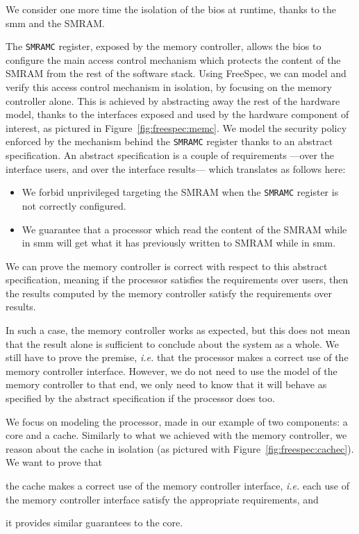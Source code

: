 \begin{example}
  We consider one more time the isolation of the \ac{bios} at runtime, thanks to
  the \ac{smm} and the SMRAM.

  The \texttt{SMRAMC} register, exposed by the memory controller, allows the
  \ac{bios} to configure the main access control mechanism which protects the
  content of the SMRAM from the rest of the software stack.
  Using FreeSpec, we can model and verify this access control mechanism in
  isolation, by focusing on the memory controller alone.
  This is achieved by abstracting away the rest of the hardware model, thanks to
  the interfaces exposed and used by the hardware component of interest, as
  pictured in Figure~\ref{fig:freespec:memc}.
  We model the security policy enforced by the mechanism behind the
  \texttt{SMRAMC} register thanks to an abstract specification.
  An abstract specification is a couple of requirements ---over the interface
  users, and over the interface results--- which translates as follows here:
  \begin{itemize}
  \item We forbid unprivileged \IO targeting the SMRAM when the \texttt{SMRAMC}
    register is not correctly configured.
  \item We guarantee that a processor which read the content of the SMRAM while
    in \ac{smm} will get what it has previously written to SMRAM while in
    \ac{smm}.
  \end{itemize}
  We can prove the memory controller is correct with respect to this abstract
  specification, meaning if the processor satisfies the requirements over users,
  then the results computed by the memory controller satisfy the requirements
  over results.

  In such a case, the memory controller works as expected, but this does not
  mean that the result alone is sufficient to conclude about the system as a
  whole.
  We still have to prove the premise, \emph{i.e.} that the processor makes a
  correct use of the memory controller interface.
  However, we do not need to use the model of the memory controller to that end,
  we only need to know that it will behave as specified by the abstract
  specification if the processor does too.

  We focus on modeling the processor, made in our example of two components: a
  core and a cache.
  Similarly to what we achieved with the memory controller, we reason about the
  cache in isolation (as pictured with Figure~\ref{fig:freespec:cachec}).
  We want to prove that
  \begin{inparaenum}
  \item the cache makes a correct use of the memory controller interface,
    \emph{i.e.} each use of the memory controller interface satisfy the
    appropriate requirements, and
  \item it provides similar guarantees to the core.
  \end{inparaenum}


\end{example}
